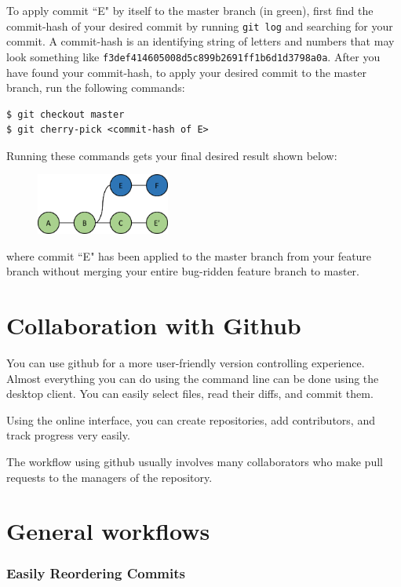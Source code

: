 \documentclass[12pt]{report}
\renewcommand\section[1]{{\chapter{#1}}}
\begin{document}
To apply commit ``E" by itself to the master branch (in green), first find the commit-hash of your desired commit by running \texttt{git log} and searching for your commit.  A commit-hash is an identifying string of letters and numbers that may look something like \texttt{f3def414605008d5c899b2691ff1b6d1d3798a0a}.  After you have found your commit-hash, to apply your desired commit to the master branch, run the following commands:
\begin{verbatim}
$ git checkout master
$ git cherry-pick <commit-hash of E>
\end{verbatim}

Running these commands gets your final desired result shown below:

\begin{figure}[h]
\center
\includegraphics[height=2cm]{cherrypick}
\end{figure}

where commit ``E" has been applied to the master branch from your feature branch without merging your entire bug-ridden feature branch to master.

\section{Collaboration with Github}

You can use github for a more user-friendly version controlling experience.  Almost everything you can do using the command line can be done using the desktop client.  You can easily select files, read their diffs, and commit them.
 

Using the online interface, you can create repositories, add contributors, and track progress very easily.

The workflow using github usually involves many collaborators who make pull requests to the managers of the repository.


\section{General workflows}

\subsection{Easily Reordering Commits}
\end{document}
